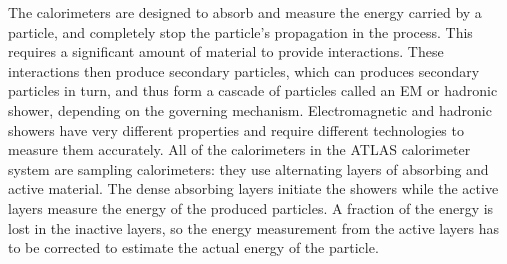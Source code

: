 
The calorimeters are designed to absorb and measure the energy carried by a particle, and completely stop the particle's propagation in the process.
This requires a significant amount of material to provide interactions.
These interactions then produce secondary particles, which can produces secondary particles in turn, and thus form a cascade of particles called an \ac{EM} or hadronic shower, depending on the governing mechanism.
Electromagnetic and hadronic showers have very different properties and require different technologies to measure them accurately.
All of the calorimeters in the \ac{ATLAS} calorimeter system are sampling calorimeters: they use alternating layers of absorbing and active material.
The dense absorbing layers initiate the showers while the active layers measure the energy of the produced particles.
A fraction of the energy is lost in the inactive layers, so the energy measurement from the active layers has to be corrected to estimate the actual energy of the particle.


